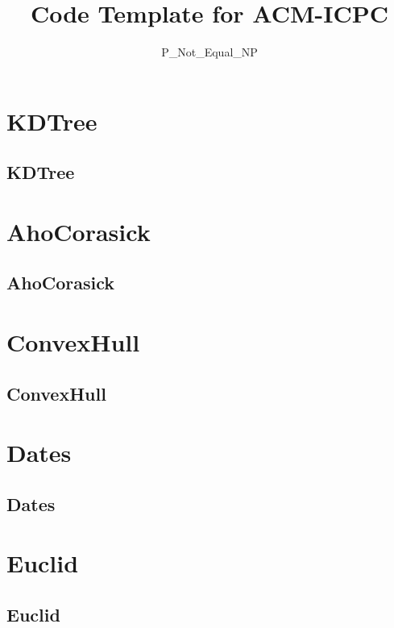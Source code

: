 \documentclass[a4paper, twocolumn]{article}
\title{Code Template for ACM-ICPC}
\author{P\_Not\_Equal\_NP}
\begin{document}
\begin{titlepage}
\maketitle
\thispagestyle{empty}
\pagebreak
\pagestyle{fancy}
\lhead{}
\rhead{}
\cfoot{}
\tableofcontents
\end{titlepage}

\pagestyle{fancy}
\cfoot{- \thepage \ -}
  
\section{KDTree}
\subsection{KDTree}

\section{AhoCorasick}
\subsection{AhoCorasick}

\section{ConvexHull}
\subsection{ConvexHull}

\section{Dates}
\subsection{Dates}

\section{Euclid}
\subsection{Euclid}

\end{document}
